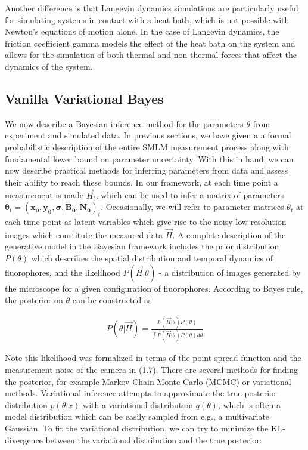 \documentclass{ucetd}
\begin{document}
Another difference is that Langevin dynamics simulations are particularly useful for simulating systems in contact with a heat bath, which is not possible with Newton's equations of motion alone. In the case of Langevin dynamics, the friction coefficient gamma models the effect of the heat bath on the system and allows for the simulation of both thermal and non-thermal forces that affect the dynamics of the system.


\begin{appendices}



\subsection{Vanilla Variational Bayes}

We now describe a Bayesian inference method for the parameters $\theta$ from experiment and simulated data. In previous sections, we have given a a formal probabilistic description of the entire SMLM measurement process along with fundamental lower bound on parameter uncertainty. With this in hand, we can now describe practical methods for inferring parameters from data and assess their ability to reach these bounds.  In our framework, at each time point a measurement is made $\vec{H}_{t}$, which can be used to infer a matrix of parameters $\bm{\theta}_{t} = (\bm{x_{0}},\bm{y_{0}},\bm{\sigma},\bm{B_{0}},\bm{N_{0}})_{t}$. Occasionally, we will refer to parameter matrices $\theta_{t}$ at each time point as latent variables which give rise to the noisy low resolution images which constitute the measured data $\vec{H}$. A complete description of the generative model in the Bayesian framework includes the prior distribution $P(\theta)$ which describes the spatial distribution and temporal dynamics of fluorophores, and the likelihood $P(\vec{H}|\theta)$ - a distribution of images generated by the microscope for a given configuration of fluorophores. According to Bayes rule, the posterior on $\theta$ can be constructed as

\begin{align}
P(\theta|\vec{H}) = \frac{P(\vec{H}|\theta)P(\theta)}{\int P(\vec{H}|\theta)P(\theta) d\theta}
\end{align}

Note this likelihood was formalized in terms of the point spread function and the measurement noise of the camera in (1.7). There are several methods for finding the posterior, for example Markov Chain Monte Carlo (MCMC) or variational methods. Variational inference attempts to approximate the true posterior distribution $p(\theta|x)$ with a variational distribution $q(\theta)$, which is often a model distribution which can be easily sampled from e.g., a multivariate Gaussian. To fit the variational distribution, we can try to minimize the KL-divergence between the variational distribution and the true posterior:


\end{appendices}
\end{document}
